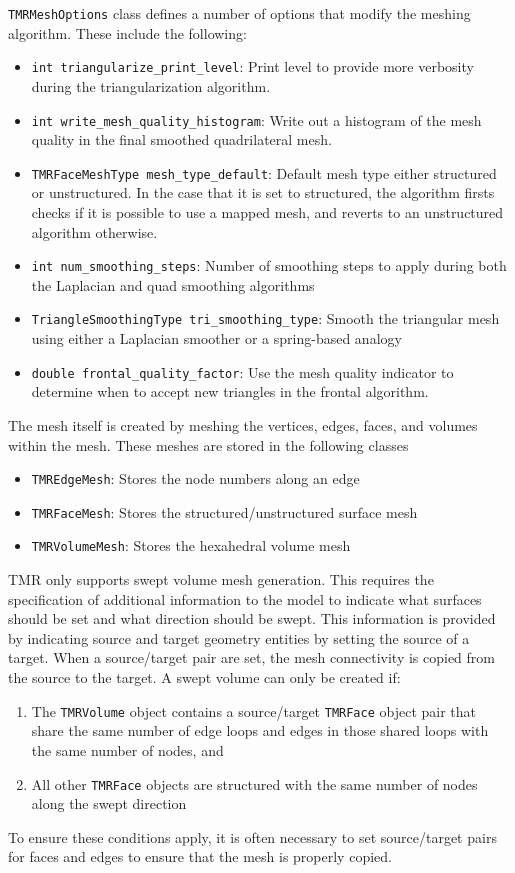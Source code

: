 \documentclass[12pt]{article}
\begin{document}
\texttt{TMRMeshOptions} class defines a number of options that modify the meshing algorithm. These include the following:
\begin{itemize}
\item \texttt{int triangularize\_print\_level}: Print level to provide more
  verbosity during the triangularization algorithm.
\item \texttt{int write\_mesh\_quality\_histogram}: Write out a histogram of the mesh quality in the final smoothed quadrilateral mesh.
\item \texttt{TMRFaceMeshType mesh\_type\_default}: Default mesh type either structured or unstructured. In the case that it is set to structured, the algorithm firsts checks if it is possible to use a mapped mesh, and reverts to an unstructured algorithm otherwise.
\item \texttt{int num\_smoothing\_steps}: Number of smoothing steps to apply during both the Laplacian and quad smoothing algorithms
\item \texttt{TriangleSmoothingType tri\_smoothing\_type}: Smooth the triangular mesh using either a Laplacian smoother or a spring-based analogy
\item \texttt{double frontal\_quality\_factor}: Use the mesh quality indicator to determine when to accept new triangles in the frontal algorithm.
\end{itemize}

The mesh itself is created by meshing the vertices, edges, faces, and volumes within the mesh.
These meshes are stored in the following classes
%
\begin{itemize}
\item \texttt{TMREdgeMesh}: Stores the node numbers along an edge
\item \texttt{TMRFaceMesh}: Stores the structured/unstructured surface mesh
\item \texttt{TMRVolumeMesh}: Stores the hexahedral volume mesh
\end{itemize}

TMR only supports swept volume mesh generation.
This requires the specification of additional information to the model to indicate what surfaces should be set and what direction should be swept.
This information is provided by indicating source and target geometry entities by setting the source of a target.
When a source/target pair are set, the mesh connectivity is copied from the source to the target. 
A swept volume can only be created if:
\begin{enumerate}
\item The \texttt{TMRVolume} object contains a source/target \texttt{TMRFace} object pair that share the same number of edge loops and edges in those shared loops with the same number of nodes, and
\item All other \texttt{TMRFace} objects are structured with the same number of nodes along the swept direction
\end{enumerate}
%
To ensure these conditions apply, it is often necessary to set source/target pairs for faces and edges to ensure that the mesh is properly copied.
\end{document}

